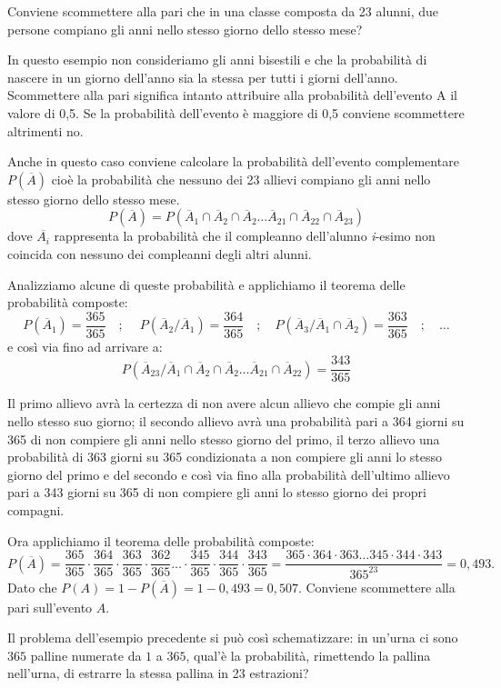 \begin{esempio}
Conviene scommettere alla pari che in una classe composta da 23 alunni, due 
persone compiano gli anni nello stesso giorno dello stesso mese?

In questo esempio non consideriamo gli anni bisestili e che la probabilità di 
nascere in un giorno dell'anno sia la stessa per tutti i giorni dell'anno. 
Scommettere alla pari significa intanto attribuire alla probabilità dell'evento 
A il valore di 0,5. Se la probabilità dell'evento è maggiore di 0,5 conviene 
scommettere altrimenti no.

Anche in questo caso conviene calcolare la probabilità dell'evento 
complementare 
$P(\overline A)$ cioè la probabilità che nessuno dei 23 allievi compiano gli 
anni nello stesso giorno dello stesso mese.
\[P(\overline A)=P(\overline A_1\cap 
\overline A_2\cap \overline A_2\ldots \overline A_{21}\cap \overline A_{22}\cap 
\overline A_{23})\] dove $\overline{A_i}$ rappresenta la probabilità che il 
compleanno dell'alunno \emph{i}{}-esimo non coincida con nessuno dei compleanni 
degli altri alunni.

Analizziamo alcune di queste probabilità e applichiamo il teorema delle 
probabilità composte: \[P(\overline A_1)=\frac{365}{365}\quad ;\quad \ P(\overline 
A_2/\overline A_1)=\frac{364}{365} \quad ;\quad  P(\overline A_3/\overline A_1\cap 
\overline 
A_2)=\frac{363}{365}\quad ;\quad \dots\] e così via fino ad arrivare a: 
\[P(\overline A_{23}/\overline A_1\cap \overline A_2\cap \overline A_2\ldots 
\overline A_{21}\cap \overline A_{22})=\frac{343}{365}\]

Il primo allievo avrà la certezza di non avere alcun allievo che compie gli 
anni 
nello stesso suo giorno; il secondo allievo avrà una probabilità pari a 364 
giorni su 365 di non compiere gli anni nello stesso giorno del primo, il terzo 
allievo una probabilità di 363 giorni su 365 condizionata a non compiere gli 
anni lo stesso giorno del primo e del secondo e così via fino alla probabilità 
dell'ultimo allievo pari a 343 giorni su 365 di non compiere gli anni lo stesso 
giorno dei propri compagni.

Ora applichiamo il teorema delle probabilità composte: \[ P(\overline 
A)=\frac{365}{365}\cdot \frac{364}{365}\cdot \frac{363}{365}\cdot 
\frac{362}{365}\ldots \cdot \frac{345}{365}\cdot \frac{344}{365}\cdot 
\frac{343}{365}=\frac{365\cdot 364\cdot 363\ldots 345 \cdot 344\cdot 
343}{365^{23}}=0,493. \] Dato che $P(A)=1-P(\overline A)=1-0,493=0,507$.
\conclusione Conviene scommettere alla pari sull'evento $ A $.
\end{esempio}
Il problema dell'esempio precedente si può così schematizzare: in un'urna ci 
sono $ 365 $ palline numerate da $ 1 $ a $ 365 $, qual'è la probabilità, 
rimettendo la pallina nell'urna, di estrarre la stessa pallina in 23 estrazioni?

